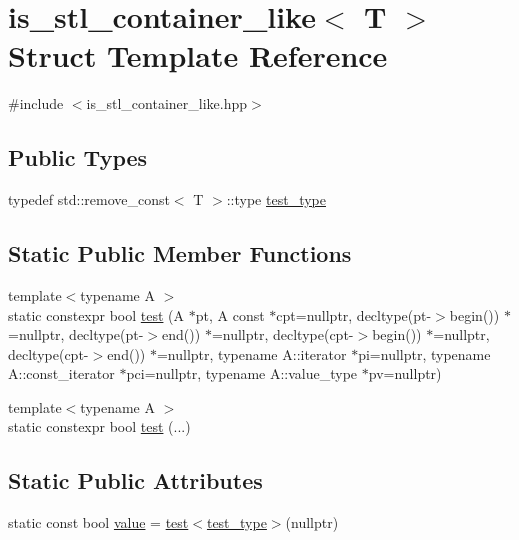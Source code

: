 \hypertarget{structis__stl__container__like}{}\section{is\+\_\+stl\+\_\+container\+\_\+like$<$ T $>$ Struct Template Reference}
\label{structis__stl__container__like}


{\ttfamily \#include $<$is\+\_\+stl\+\_\+container\+\_\+like.\+hpp$>$}

\subsection*{Public Types}
\begin{DoxyCompactItemize}
\item 
typedef std\+::remove\+\_\+const$<$ T $>$\+::type \hyperlink{structis__stl__container__like_a4963c0bde8b0f68013b20041308b82e5}{test\+\_\+type}
\end{DoxyCompactItemize}
\subsection*{Static Public Member Functions}
\begin{DoxyCompactItemize}
\item 
{\footnotesize template$<$typename A $>$ }\\static constexpr bool \hyperlink{structis__stl__container__like_ada5dd0e7feabf4e4f7fe79db7de5d31d}{test} (A $\ast$pt, A const $\ast$cpt=nullptr, decltype(pt-\/$>$begin()) $\ast$=nullptr, decltype(pt-\/$>$end()) $\ast$=nullptr, decltype(cpt-\/$>$begin()) $\ast$=nullptr, decltype(cpt-\/$>$end()) $\ast$=nullptr, typename A\+::iterator $\ast$pi=nullptr, typename A\+::const\+\_\+iterator $\ast$pci=nullptr, typename A\+::value\+\_\+type $\ast$pv=nullptr)
\item 
{\footnotesize template$<$typename A $>$ }\\static constexpr bool \hyperlink{structis__stl__container__like_a44d72e8e872d7eb954dca89f6103e817}{test} (...)
\end{DoxyCompactItemize}
\subsection*{Static Public Attributes}
\begin{DoxyCompactItemize}
\item 
static const bool \hyperlink{structis__stl__container__like_a78703ef8497a4ebf27445e64d2eba742}{value} = \hyperlink{structis__stl__container__like_ada5dd0e7feabf4e4f7fe79db7de5d31d}{test}$<$\hyperlink{structis__stl__container__like_a4963c0bde8b0f68013b20041308b82e5}{test\+\_\+type}$>$(nullptr)
\end{DoxyCompactItemize}


